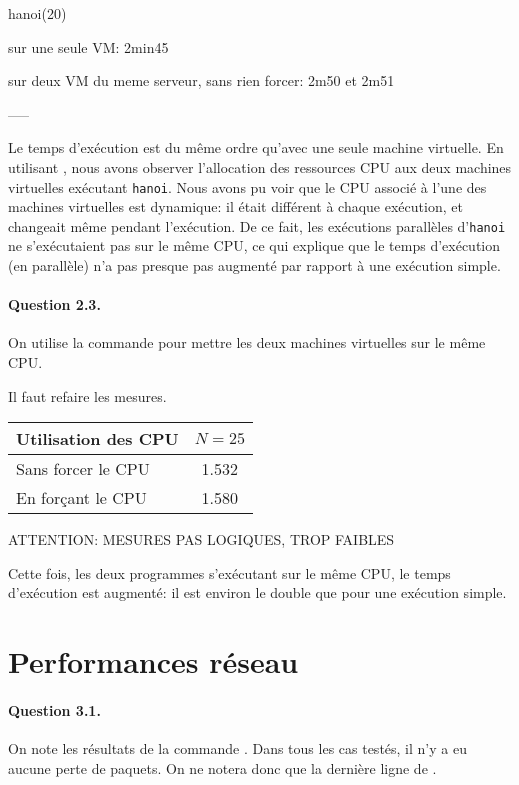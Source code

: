 \documentclass[12pt]{article}
\begin{document}
hanoi(20)

sur une seule VM: 2min45

sur deux VM du meme serveur, sans rien forcer: 2m50 et 2m51





-----




Le temps d'exécution est du même ordre qu'avec une seule machine virtuelle. En utilisant , nous avons observer l'allocation des ressources CPU aux deux machines virtuelles exécutant \texttt{hanoi}. Nous avons pu voir que le CPU associé à l'une des machines virtuelles est dynamique: il était différent à chaque exécution, et changeait même pendant l'exécution. De ce fait, les exécutions parallèles d'\texttt{hanoi} ne s'exécutaient pas sur le même CPU, ce qui explique que le temps d'exécution (en parallèle) n'a pas presque pas augmenté par rapport à une exécution simple.


\paragraph{Question 2.3.}
On utilise la commande  pour mettre les deux machines virtuelles sur le même CPU.


Il faut refaire les mesures.

\begin{tabular}{| l | c |}\hline
Utilisation des CPU & $N=25$ \\\hline
Sans forcer le CPU & 1.532 \\\hline
En forçant le CPU & 1.580 \\\hline
\end{tabular}

ATTENTION: MESURES PAS LOGIQUES, TROP FAIBLES


Cette fois, les deux programmes s'exécutant sur le même CPU, le temps d'exécution est augmenté: il est environ le double que pour une exécution simple.

\section{Performances réseau}
\paragraph{Question 3.1.}
On note les résultats de la commande . Dans tous les cas testés, il n'y a eu aucune perte de paquets. On ne notera donc que la dernière ligne de .
\\
\end{document}

